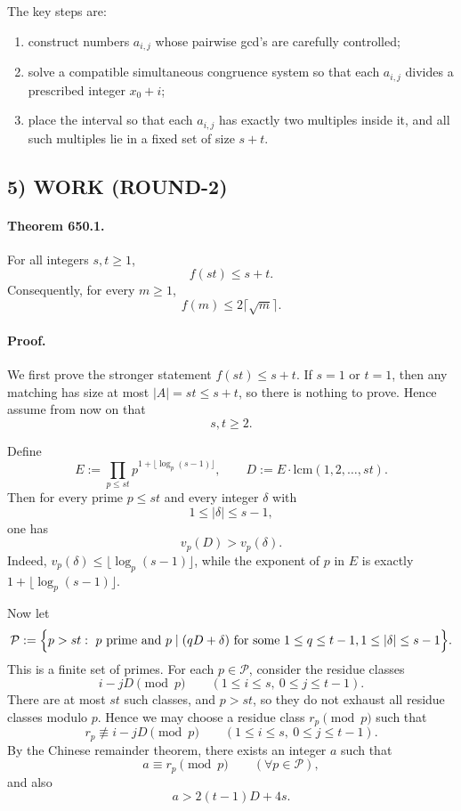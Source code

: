 The key steps are:
\begin{enumerate}
\item construct numbers $a_{i,j}$ whose pairwise gcd's are carefully controlled;
\item solve a compatible simultaneous congruence system so that each $a_{i,j}$ divides a prescribed integer $x_0+i$;
\item place the interval so that each $a_{i,j}$ has exactly two multiples inside it, and all such multiples lie in a fixed set of size $s+t$.
\end{enumerate}

\subsection*{5) WORK (ROUND-2)}
\paragraph{Theorem 650.1.}
For all integers $s,t\ge 1$,
\[
 f(st)\le s+t.
\]
Consequently, for every $m\ge 1$,
\[
 f(m)\le 2\lceil\sqrt m\rceil.
\]

\paragraph{Proof.}
We first prove the stronger statement $f(st)\le s+t$.
If $s=1$ or $t=1$, then any matching has size at most $|A|=st\le s+t$, so there is nothing to prove.
Hence assume from now on that
\[
 s,t\ge 2.
\]

Define
\[
 E:=\prod_{p\le st} p^{1+\lfloor \log_p(s-1)\rfloor},
 \qquad
 D:=E\cdot \mathrm{lcm}(1,2,\dots,st).
\]
Then for every prime $p\le st$ and every integer $\delta$ with
\[
1\le |\delta|\le s-1,
\]
one has
\[
 v_p(D)>v_p(\delta).
\]
Indeed, $v_p(\delta)\le \lfloor \log_p(s-1)\rfloor$, while the exponent of $p$ in $E$ is exactly $1+\lfloor \log_p(s-1)\rfloor$.

Now let
\[
\mathcal P:=\Bigl\{p>st:\ p\text{ prime and } p\mid (qD+\delta)
\text{ for some }1\le q\le t-1,
1\le |\delta|\le s-1\Bigr\}.
\]
This is a finite set of primes.
For each $p\in\mathcal P$, consider the residue classes
\[
 i-jD \pmod p
 \qquad (1\le i\le s,\ 0\le j\le t-1).
\]
There are at most $st$ such classes, and $p>st$, so they do not exhaust all residue classes modulo $p$.
Hence we may choose a residue class $r_p\pmod p$ such that
\[
 r_p\not\equiv i-jD \pmod p
 \qquad (1\le i\le s,\ 0\le j\le t-1).
\]
By the Chinese remainder theorem, there exists an integer $a$ such that
\[
 a\equiv r_p \pmod p
 \qquad (\forall p\in\mathcal P),
\]
and also
\[
 a>2(t-1)D+4s.
\]

